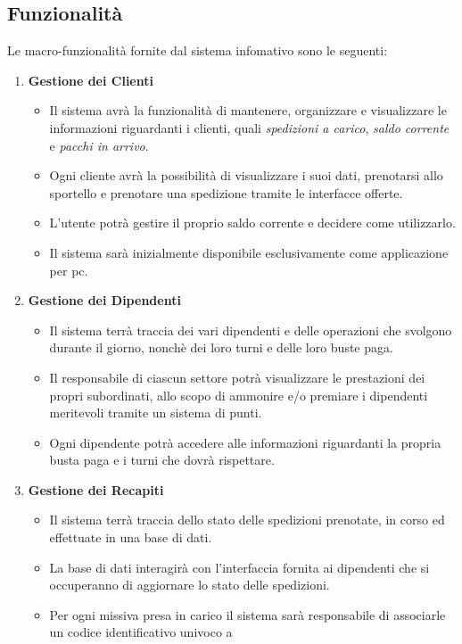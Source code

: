 \subsection{Funzionalità}
Le macro-funzionalità fornite dal sistema infomativo sono le seguenti:
\begin{enumerate}
  \item \textbf{Gestione dei Clienti} \begin{itemize}
      \item Il sistema avrà la funzionalità di mantenere, organizzare e visualizzare le informazioni riguardanti i clienti, 
        quali \textit{spedizioni a carico}, \textit{saldo corrente} e \textit{pacchi in arrivo}.
      \item Ogni cliente avrà la possibilità di visualizzare i suoi dati, prenotarsi allo sportello e prenotare una spedizione 
        tramite le interfacce offerte.
      \item L'utente potrà gestire il proprio saldo corrente e decidere come utilizzarlo.
      \item Il sistema sarà inizialmente disponibile esclusivamente come applicazione per pc.
    \end{itemize}
  \item \textbf{Gestione dei Dipendenti} \begin{itemize}
      \item Il sistema terrà traccia dei vari dipendenti e delle operazioni che svolgono durante il giorno, nonchè dei loro 
        turni e delle loro buste paga.
      \item Il responsabile di ciascun settore potrà visualizzare le prestazioni dei propri subordinati, allo scopo di 
        ammonire e/o premiare i dipendenti meritevoli tramite un sistema di punti.
      \item Ogni dipendente potrà accedere alle informazioni riguardanti la propria busta paga e i turni che dovrà rispettare.
    \end{itemize}
  \item \textbf{Gestione dei Recapiti} \begin{itemize}
      \item Il sistema terrà traccia dello stato delle spedizioni prenotate, in corso ed effettuate in una base di dati.
      \item La base di dati interagirà con l'interfaccia fornita ai dipendenti che si occuperanno di aggiornare lo stato 
        delle spedizioni.
      \item Per ogni missiva presa in carico il sistema sarà responsabile di associarle un codice identificativo univoco a 

\end{itemize}
\end{enumerate}
